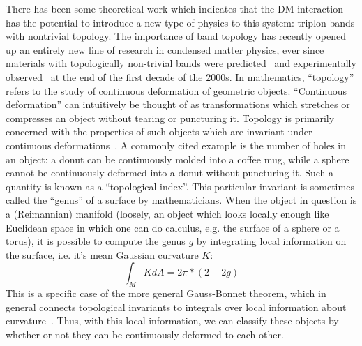 \documentclass{thesis-umich}
\begin{document}
There has been some theoretical work which indicates that the DM interaction has the potential to introduce a new type of physics to this system: triplon bands with nontrivial topology. The importance of band topology has recently opened up an entirely new line of research in condensed matter physics, ever since materials with topologically non-trivial bands were predicted~\cite{Fu2007} and experimentally observed~\cite{Hsieh2008} at the end of the first decade of the 2000s. In mathematics, ``topology'' refers to the study of continuous deformation of geometric objects. ``Continuous deformation'' can intuitively be thought of as transformations which stretches or compresses an object without tearing or puncturing it. Topology is primarily concerned with the properties of such objects which are invariant under continuous deformations~\cite{Munkres}. A commonly cited example is the number of holes in an object: a donut can be continuously molded into a coffee mug, while a sphere cannot be continuously deformed into a donut without puncturing it. Such a quantity is known as a ``topological index''. This particular invariant is sometimes called the ``genus'' of a surface by mathematicians. When the object in question is a (Reimannian) manifold (loosely, an object which looks locally enough like Euclidean space in which one can do calculus, e.g. the surface of a sphere or a torus), it is possible to compute the genus $g$ by integrating local information on the surface, i.e. it's mean Gaussian curvature $K$:
\[ \int_M K dA = 2\pi * (2 - 2 g) \]
This is a specific case of the more general Gauss-Bonnet theorem, which in general connects topological invariants to integrals over local information about curvature~\cite{Lee}. Thus, with this local information, we can classify these objects by whether or not they can be continuously deformed to each other.
\end{document}
